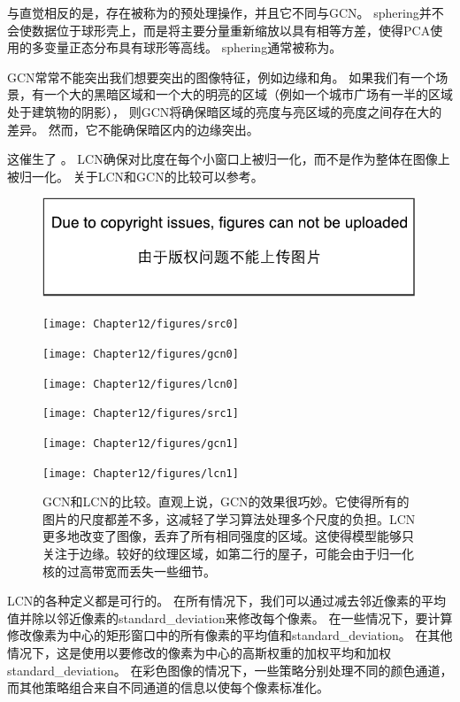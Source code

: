 与直觉相反的是，存在被称为的预处理操作，并且它不同与\gls{GCN}。
\gls{sphering}并不会使数据位于球形壳上，而是将主要分量重新缩放以具有相等方差，使得\gls{PCA}使用的多变量正态分布具有球形等高线。 
\gls{sphering}通常被称为。


\gls{GCN}常常不能突出我们想要突出的图像特征，例如边缘和角。
如果我们有一个场景，有一个大的黑暗区域和一个大的明亮的区域（例如一个城市广场有一半的区域处于建筑物的阴影），
则\gls{GCN}将确保暗区域的亮度与亮区域的亮度之间存在大的差异。
然而，它不能确保暗区内的边缘突出。

这催生了 。
\gls{LCN}确保对比度在每个小窗口上被归一化，而不是作为整体在图像上被归一化。
关于\gls{LCN}和\gls{GCN}的比较可以参考。
\begin{figure}[!htb]
\ifOpenSource
\centerline{\includegraphics{figure.pdf}}
\else
	\centerline{\texttt{[image: Chapter12/figures/src0]}}
	\centerline{\texttt{[image: Chapter12/figures/gcn0]}}
	\centerline{\texttt{[image: Chapter12/figures/lcn0]}}	
	\centerline{\texttt{[image: Chapter12/figures/src1]}}
	\centerline{\texttt{[image: Chapter12/figures/gcn1]}}
	\centerline{\texttt{[image: Chapter12/figures/lcn1]}}				
\fi
	\caption{\gls{GCN}和\gls{LCN}的比较。直观上说，\gls{GCN}的效果很巧妙。它使得所有的图片的尺度都差不多，这减轻了学习算法处理多个尺度的负担。\gls{LCN}更多地改变了图像，丢弃了所有相同强度的区域。这使得模型能够只关注于边缘。较好的纹理区域，如第二行的屋子，可能会由于归一化核的过高带宽而丢失一些细节。}
	\label{fig:122}
\end{figure}

\gls{LCN}的各种定义都是可行的。
 在所有情况下，我们可以通过减去邻近像素的平均值并除以邻近像素的\gls{standard_deviation}来修改每个像素。
在一些情况下，要计算修改像素为中心的矩形窗口中的所有像素的平均值和\gls{standard_deviation}\citep{Pinto08}。
在其他情况下，这是使用以要修改的像素为中心的高斯权重的加权平均和加权\gls{standard_deviation}。
在彩色图像的情况下，一些策略分别处理不同的颜色通道，而其他策略组合来自不同通道的信息以使每个像素标准化\citep{sermanet-icpr-12}。

